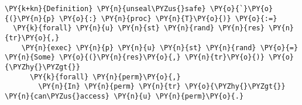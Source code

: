 \begin{BVerbatim}[commandchars=\\\{\},codes={\catcode`\$=3\catcode`\^=7\catcode`\_=8},fontsize=\footnotesize]
\PY{k+kn}{Definition} \PY{n}{unseal\PYZus{}safe} \PY{o}{`}\PY{o}{(}\PY{n}{p} \PY{o}{:} \PY{n}{proc} \PY{n}{T}\PY{o}{)} \PY{o}{:=}
  \PY{k}{forall} \PY{n}{u} \PY{n}{st} \PY{n}{rand} \PY{n}{res} \PY{n}{tr}\PY{o}{,}
    \PY{n}{exec} \PY{n}{p} \PY{n}{u} \PY{n}{st} \PY{n}{rand} \PY{o}{=} \PY{n}{Some} \PY{o}{(}\PY{n}{res}\PY{o}{,} \PY{n}{tr}\PY{o}{)} \PY{o}{\PYZhy{}\PYZgt{}}
      \PY{k}{forall} \PY{n}{perm}\PY{o}{,}
        \PY{n}{In} \PY{n}{perm} \PY{n}{tr} \PY{o}{\PYZhy{}\PYZgt{}} \PY{n}{can\PYZus{}access} \PY{n}{u} \PY{n}{perm}\PY{o}{.}
\end{BVerbatim}
